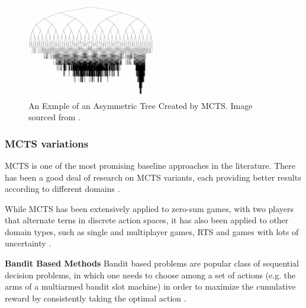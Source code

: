 \documentclass[journal]{IEEEtran}
\begin{document}
		
		\begin{figure}[h]
		    \centering
		    \includegraphics[width=0.5\textwidth]{MCTSasymmetry}
		    \caption{An Exmple of an Asymmetric Tree Created by MCTS. Image sourced from \cite{coquelin2007bandit}. }
		    \label{fig:MCTS1}
		\end{figure}




		\subsubsection{MCTS variations} \label{sssec:MCTSvariations}
			MCTS is one of the most promising baseline approaches in the  literature.
			There has been a good deal of research on MCTS variants, each providing better results according to different domains \cite{browne2012survey, park2015mcts, perez2014knowledge, ilhan2017monte, de2016monte, frydenberg2015investigating}.

			While MCTS has been extensively applied to zero-sum games, with two players that alternate terns in discrete action spaces, it has also been applied to other domain types, such as single and multiplayer games, RTS and games with lots of uncertainty \cite{browne2012survey, de2016monte, frydenberg2015investigating}.

			\textbf{Bandit Based Methods}
				Bandit based problems are popular class of sequential decision problems, in which one needs to choose among a set of actions (e.g. the arms of a multiarmed bandit slot machine) in order to maximize the cumulative reward by consistently taking the optimal action \cite{kocsis2006bandit, coquelin2007bandit}.
\end{document}
